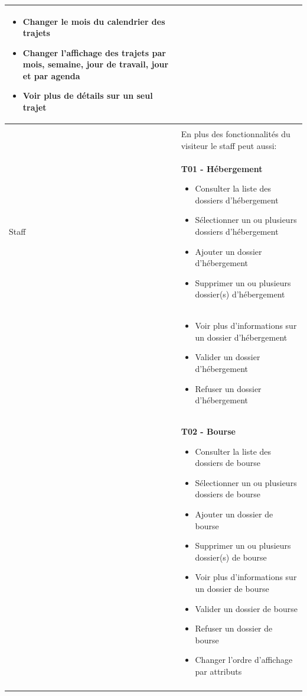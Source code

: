 \begin{longtable}{|Z{3cm}|L{10cm}|}
        \begin{itemize}
            \item Changer le mois du calendrier des trajets
            \item Changer l’affichage des trajets par mois, semaine, jour de travail, jour et par agenda
            \item Voir plus de détails sur un seul trajet
        \end{itemize}
     \\
     \hline
    & \\ &
    En plus des fonctionnalités du visiteur le staff peut aussi:\\
    Staff &
    \textbf{T01 - Hébergement}
    \begin{itemize}
        \item Consulter la liste des dossiers d'hébergement
        \item Sélectionner un ou plusieurs dossiers d'hébergement
        \item Ajouter un dossier d'hébergement
        \item Supprimer un ou plusieurs dossier(s) d'hébergement
    \end{itemize}\\
    &
    \begin{itemize}
        \item Voir plus d'informations sur un dossier d'hébergement
        \item Valider un dossier d'hébergement
        \item Refuser un dossier d'hébergement
    \end{itemize}\\
    &
    \textbf{T02 - Bourse}
    \begin{itemize}
        \item Consulter la liste des dossiers de bourse
        \item Sélectionner un ou plusieurs dossiers de bourse
        \item Ajouter un dossier de bourse
        \item Supprimer un ou plusieurs dossier(s) de bourse
        \item Voir plus d'informations sur un dossier de bourse
        \item Valider un dossier de bourse
        \item Refuser un dossier de bourse
        \item Changer l'ordre d'affichage par attributs
    \end{itemize}\\ &

\end{longtable}
